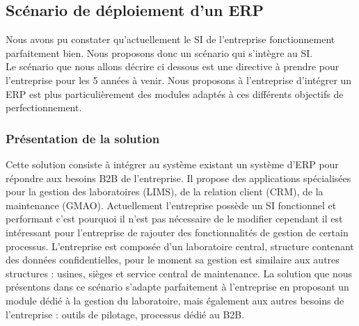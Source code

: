 \newpage
\subsection{Scénario de déploiement d'un ERP}
Nous avons pu constater qu'actuellement le SI de l'entreprise fonctionnement parfaitement bien. Nous proposons donc un scénario qui s'intègre au SI. \\
Le scénario que nous allons décrire ci dessous est une directive à prendre pour l'entreprise pour les 5 années à venir. Nous proposons à l'entreprise d'intégrer un ERP est plus particulièrement des modules adaptés à ces différents objectifs de perfectionnement.  
\subsubsection{Présentation de la solution}
Cette solution consiste à intégrer au système existant un système d'ERP pour répondre aux besoins B2B de l'entreprise. Il propose des applications spécialisées pour la gestion des laboratoires (LIMS), de la relation client (CRM), de la maintenance (GMAO). Actuellement l'entreprise possède un SI fonctionnel et performant c'est pourquoi il n'est pas nécessaire de le modifier cependant il est intéressant pour l'entreprise de rajouter des fonctionnalités de gestion de certain processus. L'entreprise est composée d'un laboratoire central, structure contenant des données confidentielles, pour le moment sa gestion est similaire aux autres structures : usines, sièges et service central de maintenance. La solution que nous présentons dans ce scénario s'adapte parfaitement à l'entreprise en proposant un module dédié à la gestion du laboratoire, mais également aux autres besoins de l'entreprise : outils de pilotage, processus dédié au B2B.   
